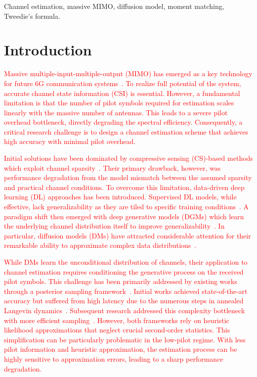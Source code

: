 \documentclass[lettersize,journal]{IEEEtran}
\newcommand{\tred}{\textcolor{red}}
\begin{document}
\begin{IEEEkeywords}
Channel estimation, massive MIMO, diffusion model, moment matching, Tweedie's formula.
\end{IEEEkeywords}


\section{Introduction}

\tred{
Massive multiple-input-multiple-output (MIMO) has emerged as a key technology for future 6G communication systems~\cite{busariMillimeterWaveMassiveMIMO2018}. To realize full potential of the system, accurate channel state information (CSI) is essential. However, a fundamental limitation is that the number of pilot symbols required for estimation scales linearly with the massive number of antennas. This leads to a severe pilot overhead bottleneck, directly degrading the spectral efficiency. Consequently, a critical research challenge is to design a channel estimation scheme that achieves high accuracy with minimal pilot overhead.
}

\tred{
Initial solutions have been dominated by compressive sensing (CS)-based methods which exploit channel sparsity~\cite{zhangAtomicNormDenoisingBased2018,mendez-rialHybridMIMOArchitectures2016,choiCompressedSensingWireless2017}. Their primary drawback, however, was performance degradation from the model mismatch between the assumed sparsity and practical channel conditions. To overcome this limitation, data-driven deep learning (DL) approaches has been introduced. Supervised DL models, while effective, lack generalizability as they are tiled to specific training conditions~\cite{heDeepLearningBasedChannel2018}. A paradigm shift then emerged with deep generative models (DGMs) which learn the underlying channel distribution itself to improve generalizability~\cite{vanhuynhGenerativeAIPhysical2024}. In particular, diffusion models (DMs) have attracted considerable attention for their remarkable ability to approximate complex data distributions~\cite{hoDenoisingDiffusionProbabilistic2020}.
}

\tred{
While DMs learn the unconditional distribution of channels, their application to channel estimation requires conditioning the generative process on the received pilot symbols. This challenge has been primarily addressed by existing works through a posterior sampling framework~\cite{arvinteMIMOChannelEstimation2023,zhouGenerativeDiffusionModels2025}. Initial works achieved state-of-the-art accuracy but suffered from high latency due to the numerous steps in annealed Langevin dynamics~\cite{arvinteMIMOChannelEstimation2023}. Subsequent research addressed this complexity bottleneck with more efficient sampling~\cite{zhouGenerativeDiffusionModels2025}. However, both frameworks rely on heuristic likelihood approximations that neglect crucial second-order statistics. This simplification can be particularly problematic in the low-pilot regime. With less pilot information and heuristic approximation, the estimation process can be highly sensitive to approximation errors, leading to a sharp performance degradation.
}
\end{document}
